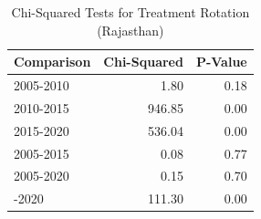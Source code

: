 \begin{table}[!h]
\centering
\caption{\label{tab:chi_sq_raj}Chi-Squared Tests for Treatment Rotation (Rajasthan)}
\centering
\fontsize{8}{10}\selectfont
\begin{tabular}[t]{lrr}
\toprule
Comparison & Chi-Squared & P-Value\\
\midrule
2005-2010 & 1.80 & 0.18\\
2010-2015 & 946.85 & 0.00\\
2015-2020 & 536.04 & 0.00\\
2005-2015 & 0.08 & 0.77\\
2005-2020 & 0.15 & 0.70\\
\addlinespace
2010-2020 & 111.30 & 0.00\\
\bottomrule
\end{tabular}
\end{table}
